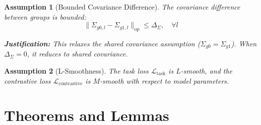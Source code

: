 \documentclass[11pt]{article}
\newtheorem{assumption}{Assumption}
\begin{document}
\begin{assumption}[Bounded Covariance Difference]
\label{ass:bound_cov}
The covariance difference between groups is bounded:
$$\|\Sigma_{g0,l} - \Sigma_{g1,l}\|_{\mathrm{op}} \leq \Delta_{\Sigma}, \quad \forall l$$

\textbf{Justification:} This relaxes the shared covariance assumption ($\Sigma_{g0} = \Sigma_{g1}$). When $\Delta_{\Sigma} = 0$, it reduces to shared covariance.
\end{assumption}

\begin{assumption}[L-Smoothness]
\label{ass:smooth}
The task loss $\mathcal{L}_{\mathrm{task}}$ is $L$-smooth, and the contrastive loss $\mathcal{L}_{\mathrm{contrastive}}$ is $M$-smooth with respect to model parameters.
\end{assumption}

\section{Theorems and Lemmas}
\end{document}
